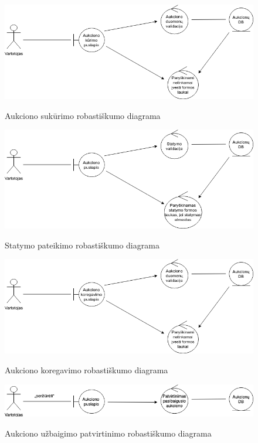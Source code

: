 \documentclass{VUMIFPSkursinis}
\begin{document}
		\begin{figure}[H]
		\centering
		\includegraphics[width=\linewidth]{img/sukurti.png}
		\label{fig:sukurti}
		\caption{Aukciono sukūrimo robastiškumo diagrama}
	\end{figure}

		\begin{figure}[H]
		\centering
		\includegraphics[width=\linewidth]{img/statymas.png}
		\label{fig:statymas}
		\caption{Statymo pateikimo robastiškumo diagrama}
	\end{figure}

		\begin{figure}[H]
		\centering
		\includegraphics[width=\linewidth]{img/koreguoti.png}
		\label{fig:koregavimas}
		\caption{Aukciono koregavimo robastiškumo diagrama}
	\end{figure}

		\begin{figure}[H]
		\centering
		\includegraphics[width=\linewidth]{img/patvirtinti.png}
		\label{fig:takebet}
		\caption{Aukciono užbaigimo patvirtinimo robastiškumo diagrama}
	\end{figure}
\end{document}

